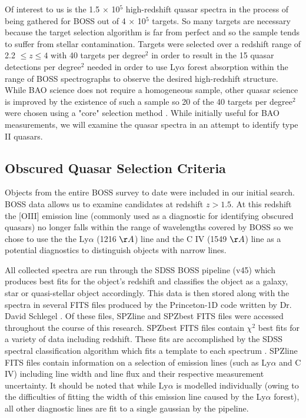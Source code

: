 \documentclass[preprint]{aastex}
\begin{document}
Of interest to us is the 1.5 $\times$ 10$^5$ high-redshift quasar spectra in the process of being gathered for BOSS out of 4 $\times$ 10$^5$ targets.  So many targets are necessary because the target selection algorithm is far from perfect and so the sample tends to suffer from stellar contamination.  Targets were selected over a redshift range of 2.2 $\leq z \leq 4$ with 40 targets per degree$^2$ in order to result in the 15 quasar detections per degree$^2$ needed in order to use Ly$\alpha$ forest absorption within the range of BOSS spectrographs to observe the desired high-redshift structure.  While BAO science does not require a homogeneous sample, other quasar science is improved by the existence of such a sample so 20 of the 40 targets per degree$^2$ were chosen using a "core" selection method \citep{2011arXiv1101.1529E}.  While initially useful for BAO measurements, we will examine the quasar spectra in an attempt to identify type II quasars.

\subsection{Obscured Quasar Selection Criteria}

Objects from the entire BOSS survey to date were included in our initial search.  BOSS data allows us to examine candidates at redshift $z > 1.5$.  At this redshift the [OIII] emission line (commonly used as a diagnostic for identifying obscured quasars) no longer falls within the range of wavelengths covered by BOSS so we chose to use the the Ly$\alpha$ (1216 $\AA$) line and the C IV (1549 $\AA$) line as a potential diagnostics to distinguish objects with narrow lines.  

All collected spectra are run through the SDSS BOSS pipeline (v45) which produces best fits for the object's redshift and classifies the object as a galaxy, star or quasi-stellar object accordingly.  This data is then stored along with the spectra in several FITS files produced by the Princeton-1D code written by Dr. David Schlegel \citep[see][]{2003AAS...20314503S}.  Of these files, SPZline and SPZbest FITS files were accessed throughout the course of this research.  SPZbest FITS files contain $\chi^2$ best fits for a variety of data including redshift.  These fits are accomplished by the SDSS spectral classification algorithm which fits a template to each spectrum \citep{2003AAS...20314503S}.  SPZline FITS files contain information on a selection of emission lines (such as Ly$\alpha$ and C IV) including line width and line flux and their respective measurement uncertainty.  It should be noted that while Ly$\alpha$ is modelled individually (owing to the difficulties of fitting the width of this emission line caused by the Ly$\alpha$ forest), all other diagnostic lines are fit to a single gaussian by the pipeline. 
\end{document}
